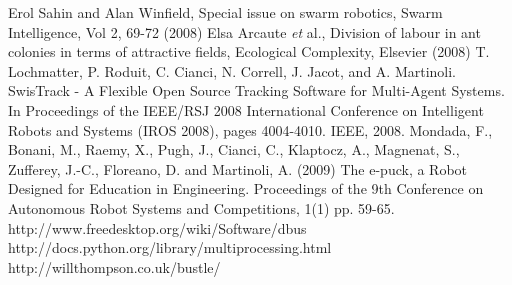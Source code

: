 \documentclass{llncs}
\begin{document}
\begin{thebibliography}{}
Erol Sahin and Alan Winfield, Special issue on swarm robotics, Swarm Intelligence, Vol 2, 69-72 (2008)
Elsa Arcaute \textit{et} al., Division of labour in ant colonies in terms of attractive fields, Ecological Complexity, Elsevier (2008)
T. Lochmatter, P. Roduit, C. Cianci, N. Correll, J. Jacot, and A. Martinoli. SwisTrack - A Flexible Open Source Tracking Software for Multi-Agent Systems. In Proceedings of the IEEE/RSJ 2008 International Conference on Intelligent Robots and Systems (IROS 2008), pages 4004-4010. IEEE, 2008.
Mondada, F., Bonani, M., Raemy, X., Pugh, J., Cianci, C., Klaptocz, A., Magnenat, S., Zufferey, J.-C., Floreano, D. and Martinoli, A. (2009) The e-puck, a Robot Designed for Education in Engineering. Proceedings of the 9th Conference on Autonomous Robot Systems and Competitions, 1(1) pp. 59-65.
http://www.freedesktop.org/wiki/Software/dbus
http://docs.python.org/library/multiprocessing.html
http://willthompson.co.uk/bustle/
\end{thebibliography}
%
\end{document}
